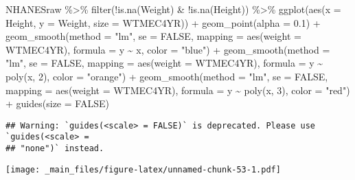 \documentclass[
]{book}
\newenvironment{Shaded}{\begin{snugshade}}{\end{snugshade}}
\newcommand{\AttributeTok}[1]{\textcolor[rgb]{0.77,0.63,0.00}{#1}}
\newcommand{\ConstantTok}[1]{\textcolor[rgb]{0.00,0.00,0.00}{#1}}
\newcommand{\DecValTok}[1]{\textcolor[rgb]{0.00,0.00,0.81}{#1}}
\newcommand{\FloatTok}[1]{\textcolor[rgb]{0.00,0.00,0.81}{#1}}
\newcommand{\FunctionTok}[1]{\textcolor[rgb]{0.00,0.00,0.00}{#1}}
\newcommand{\NormalTok}[1]{#1}
\newcommand{\SpecialCharTok}[1]{\textcolor[rgb]{0.00,0.00,0.00}{#1}}
\newcommand{\StringTok}[1]{\textcolor[rgb]{0.31,0.60,0.02}{#1}}
\theoremstyle{definition}
\theoremstyle{definition}
\theoremstyle{definition}
\theoremstyle{definition}
\theoremstyle{remark}
\begin{document}
\begin{Shaded}
\begin{Highlighting}[]
\NormalTok{NHANESraw }\SpecialCharTok{\%\textgreater{}\%} 
  \FunctionTok{filter}\NormalTok{(}\SpecialCharTok{!}\FunctionTok{is.na}\NormalTok{(Weight) }\SpecialCharTok{\&} \SpecialCharTok{!}\FunctionTok{is.na}\NormalTok{(Height)) }\SpecialCharTok{\%\textgreater{}\%}
  \FunctionTok{ggplot}\NormalTok{(}\FunctionTok{aes}\NormalTok{(}\AttributeTok{x =}\NormalTok{ Height, }\AttributeTok{y =}\NormalTok{ Weight, }\AttributeTok{size =}\NormalTok{ WTMEC4YR)) }\SpecialCharTok{+}
  \FunctionTok{geom\_point}\NormalTok{(}\AttributeTok{alpha =} \FloatTok{0.1}\NormalTok{) }\SpecialCharTok{+}
  \FunctionTok{geom\_smooth}\NormalTok{(}\AttributeTok{method =} \StringTok{"lm"}\NormalTok{, }\AttributeTok{se =} \ConstantTok{FALSE}\NormalTok{, }\AttributeTok{mapping =} \FunctionTok{aes}\NormalTok{(}\AttributeTok{weight =}\NormalTok{ WTMEC4YR), }
              \AttributeTok{formula =}\NormalTok{ y }\SpecialCharTok{\textasciitilde{}}\NormalTok{ x, }\AttributeTok{color =} \StringTok{"blue"}\NormalTok{) }\SpecialCharTok{+}
  \FunctionTok{geom\_smooth}\NormalTok{(}\AttributeTok{method =} \StringTok{"lm"}\NormalTok{, }\AttributeTok{se =} \ConstantTok{FALSE}\NormalTok{, }\AttributeTok{mapping =} \FunctionTok{aes}\NormalTok{(}\AttributeTok{weight =}\NormalTok{ WTMEC4YR), }
              \AttributeTok{formula =}\NormalTok{ y }\SpecialCharTok{\textasciitilde{}} \FunctionTok{poly}\NormalTok{(x, }\DecValTok{2}\NormalTok{), }\AttributeTok{color =} \StringTok{"orange"}\NormalTok{) }\SpecialCharTok{+}
  \FunctionTok{geom\_smooth}\NormalTok{(}\AttributeTok{method =} \StringTok{"lm"}\NormalTok{, }\AttributeTok{se =} \ConstantTok{FALSE}\NormalTok{, }\AttributeTok{mapping =} \FunctionTok{aes}\NormalTok{(}\AttributeTok{weight =}\NormalTok{ WTMEC4YR), }
              \AttributeTok{formula =}\NormalTok{ y }\SpecialCharTok{\textasciitilde{}} \FunctionTok{poly}\NormalTok{(x, }\DecValTok{3}\NormalTok{), }\AttributeTok{color =} \StringTok{"red"}\NormalTok{) }\SpecialCharTok{+}
\FunctionTok{guides}\NormalTok{(}\AttributeTok{size =} \ConstantTok{FALSE}\NormalTok{) }
\end{Highlighting}
\end{Shaded}

\begin{verbatim}
## Warning: `guides(<scale> = FALSE)` is deprecated. Please use `guides(<scale> =
## "none")` instead.
\end{verbatim}

\texttt{[image: \_main\_files/figure-latex/unnamed-chunk-53-1.pdf]}
\end{document}
